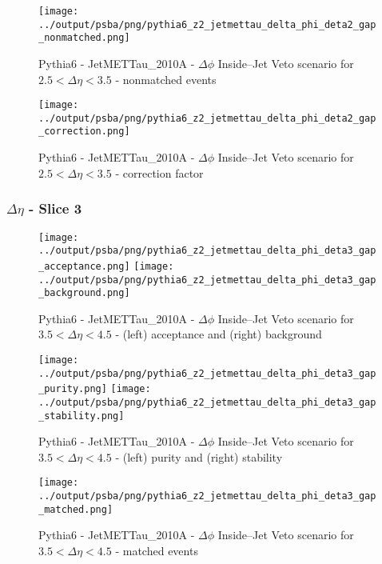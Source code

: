 \documentclass[11pt]{book}
\begin{document}
\begin{figure}[ht]
\centering
\texttt{[image: ../output/psba/png/pythia6\_z2\_jetmettau\_delta\_phi\_deta2\_gap\_nonmatched.png]}
\caption{Pythia6 - JetMETTau\_2010A - $\Delta\phi$ Inside--Jet Veto scenario for $2.5 < \Delta\eta < 3.5$ - nonmatched events}
\label{fig:p6_jetmettau_delta_phi_deta2_gap_nonmatched}
\end{figure}

\begin{figure}[ht]
\centering
\texttt{[image: ../output/psba/png/pythia6\_z2\_jetmettau\_delta\_phi\_deta2\_gap\_correction.png]}
\caption{Pythia6 - JetMETTau\_2010A - $\Delta\phi$ Inside--Jet Veto scenario for $2.5 < \Delta\eta < 3.5$ - correction factor}
\label{fig:p6_jetmettau_delta_phi_deta2_gap_correction}
\end{figure}

\clearpage
\subsubsection{$\Delta\eta$ - Slice 3}
\begin{figure}[ht]
\centering
\texttt{[image: ../output/psba/png/pythia6\_z2\_jetmettau\_delta\_phi\_deta3\_gap\_acceptance.png]}
\texttt{[image: ../output/psba/png/pythia6\_z2\_jetmettau\_delta\_phi\_deta3\_gap\_background.png]}
\caption{Pythia6 - JetMETTau\_2010A - $\Delta\phi$ Inside--Jet Veto scenario for $3.5 < \Delta\eta < 4.5$ - (left) acceptance and (right) background}
\label{fig:p6_jetmettau_delta_phi_deta3_gap_ab}
\end{figure}

\begin{figure}[ht]
\centering
\texttt{[image: ../output/psba/png/pythia6\_z2\_jetmettau\_delta\_phi\_deta3\_gap\_purity.png]}
\texttt{[image: ../output/psba/png/pythia6\_z2\_jetmettau\_delta\_phi\_deta3\_gap\_stability.png]}
\caption{Pythia6 - JetMETTau\_2010A - $\Delta\phi$ Inside--Jet Veto scenario for $3.5 < \Delta\eta < 4.5$ - (left) purity and (right) stability}
\label{fig:p6_jetmettau_delta_phi_deta3_gap_ps}
\end{figure}

\begin{figure}[ht]
\centering
\texttt{[image: ../output/psba/png/pythia6\_z2\_jetmettau\_delta\_phi\_deta3\_gap\_matched.png]}
\caption{Pythia6 - JetMETTau\_2010A - $\Delta\phi$ Inside--Jet Veto scenario for $3.5 < \Delta\eta < 4.5$ - matched events}
\label{fig:p6_jetmettau_delta_phi_deta3_gap_matched}
\end{figure}
\end{document}
